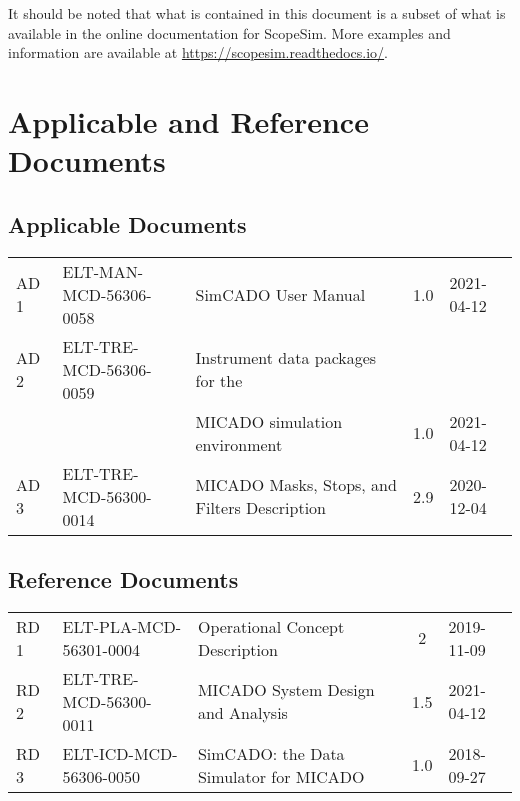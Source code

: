 It should be noted that what is contained in this document is a subset of what is available in the online documentation for ScopeSim.
More examples and information are available at \url{https://scopesim.readthedocs.io/}.


\section{Applicable and Reference Documents}
\label{sec:documents}

\subsection{Applicable Documents}

\begin{center}
  \tabletail{\hline}

  \begin{supertabular}{|l|l|l|c|l|}
    AD\,1 & ELT-MAN-MCD-56306-0058 & SimCADO User Manual & 1.0 & 2021-04-12 \\
    AD\,2 & ELT-TRE-MCD-56306-0059 & Instrument data packages for the & & \\
    & & MICADO simulation environment & 1.0 & 2021-04-12 \\
    AD\,3 & ELT-TRE-MCD-56300-0014 & MICADO Masks, Stops, and Filters Description & 2.9 & 2020-12-04 \\
  \end{supertabular}
\end{center}

\subsection{Reference Documents}

\begin{center}
  \tabletail{\hline}

  \begin{supertabular}{|l|l|l|c|l|}
    \hline
    RD\,1 & ELT-PLA-MCD-56301-0004 & Operational Concept Description &
    2 & 2019-11-09 \\
    RD\,2 & ELT-TRE-MCD-56300-0011 & MICADO System Design and Analysis & 1.5 &
    2021-04-12 \\
    RD\,3 & ELT-ICD-MCD-56306-0050 & SimCADO: the Data Simulator for MICADO & 1.0 & 2018-09-27 \\

  \end{supertabular}
\end{center}